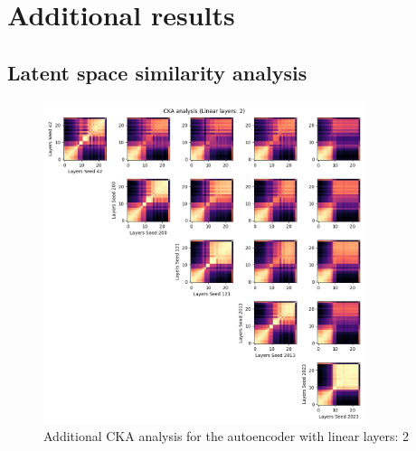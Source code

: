 \documentclass[../main.tex]{subfiles}
\begin{document}
\appendix
\renewcommand{\chaptermark}[1]{\markboth{Appendix \thechapter\relax:\thinspace\relax#1}{}}
\chapter{Additional results}
\label{sec:additionalResults}


\section{Latent space similarity analysis}
\label{sec:add_lat}

\begin{figure}[ht!]
     \centering
    \includegraphics[width=0.84\textwidth]{figures/rs/sim_ae/cka_2__42_200_121_2013_2023.png} 
    \caption{Additional CKA analysis for the autoencoder with linear layers: 2}
    \label{fig:extra_cka_ae_2} 
\end{figure}
%
\end{document}
